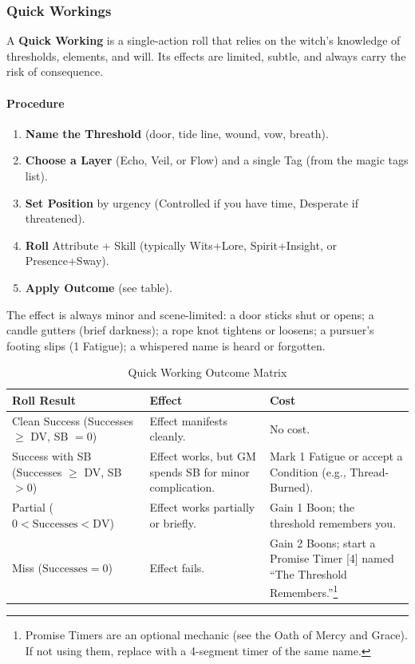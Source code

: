 \subsubsection{Quick Workings}

A \textbf{Quick Working} is a single-action roll that relies on the witch's knowledge of thresholds, elements, and will. Its effects are limited, subtle, and always carry the risk of consequence.

\paragraph{Procedure}
\begin{enumerate}
    \item \textbf{Name the Threshold} (door, tide line, wound, vow, breath).
    \item \textbf{Choose a Layer} (Echo, Veil, or Flow) and a single Tag (from the magic tags list).
    \item \textbf{Set Position} by urgency (Controlled if you have time, Desperate if threatened).
    \item \textbf{Roll} Attribute + Skill (typically Wits+Lore, Spirit+Insight, or Presence+Sway).
    \item \textbf{Apply Outcome} (see table).
\end{enumerate}

The effect is always minor and scene-limited: a door sticks shut or opens; a candle gutters (brief darkness); a rope knot tightens or loosens; a pursuer's footing slips (1 Fatigue); a whispered name is heard or forgotten.

\begin{table}[h]
\centering
\begin{tabular}{|l|l|l|}
\hline
\textbf{Roll Result} & \textbf{Effect} & \textbf{Cost} \\
\hline
Clean Success (Successes $\geq$ DV, SB $=0$) & Effect manifests cleanly. & No cost. \\
\hline
Success with SB (Successes $\geq$ DV, SB $>0$) & Effect works, but GM spends SB for minor complication. & Mark 1 Fatigue or accept a Condition (e.g., Thread-Burned). \\
\hline
Partial ($0 < \text{Successes} < \text{DV}$) & Effect works partially or briefly. & Gain 1 Boon; the threshold remembers you. \\
\hline
Miss ($\text{Successes} = 0$) & Effect fails. & Gain 2 Boons; start a Promise Timer [4] named ``The Threshold Remembers.''\footnote{Promise Timers are an optional mechanic (see the Oath of Mercy and Grace). If not using them, replace with a 4-segment timer of the same name.} \\
\hline
\end{tabular}
\caption{Quick Working Outcome Matrix}
\end{table}

